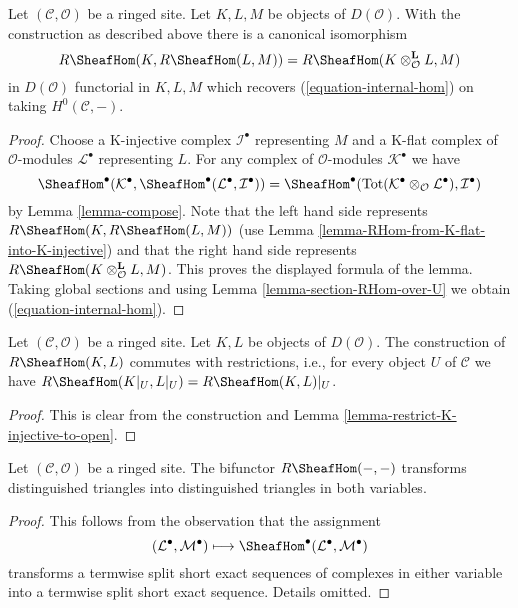 \begin{lemma}
\label{lemma-internal-hom}
Let $(\mathcal{C}, \mathcal{O})$ be a ringed site. Let $K, L, M$ be objects
of $D(\mathcal{O})$. With the construction as described above
there is a canonical isomorphism
$$
R\SheafHom(K, R\SheafHom(L, M)) =
R\SheafHom(K \otimes_\mathcal{O}^\mathbf{L} L, M)
$$
in $D(\mathcal{O})$ functorial in $K, L, M$
which recovers (\ref{equation-internal-hom}) on taking $H^0(\mathcal{C}, -)$.
\end{lemma}

\begin{proof}
Choose a K-injective complex $\mathcal{I}^\bullet$ representing
$M$ and a K-flat complex of $\mathcal{O}$-modules $\mathcal{L}^\bullet$
representing $L$.
For any complex of $\mathcal{O}$-modules $\mathcal{K}^\bullet$
we have
$$
\SheafHom^\bullet(\mathcal{K}^\bullet,
\SheafHom^\bullet(\mathcal{L}^\bullet, \mathcal{I}^\bullet))
=
\SheafHom^\bullet(
\text{Tot}(\mathcal{K}^\bullet \otimes_\mathcal{O} \mathcal{L}^\bullet),
\mathcal{I}^\bullet)
$$
by Lemma \ref{lemma-compose}.
Note that the left hand side represents
$R\SheafHom(K, R\SheafHom(L, M))$ (use
Lemma \ref{lemma-RHom-from-K-flat-into-K-injective})
and that the right hand side represents
$R\SheafHom(K \otimes_\mathcal{O}^\mathbf{L} L, M)$.
This proves the displayed formula of the lemma.
Taking global sections and using Lemma \ref{lemma-section-RHom-over-U}
we obtain (\ref{equation-internal-hom}).
\end{proof}

\begin{lemma}
\label{lemma-restriction-RHom-to-U}
Let $(\mathcal{C}, \mathcal{O})$ be a ringed site. Let $K, L$ be objects
of $D(\mathcal{O})$. The construction of $R\SheafHom(K, L)$
commutes with restrictions, i.e.,
for every object $U$ of $\mathcal{C}$ we have
$R\SheafHom(K|_U, L|_U) = R\SheafHom(K, L)|_U$.
\end{lemma}

\begin{proof}
This is clear from the construction and
Lemma \ref{lemma-restrict-K-injective-to-open}.
\end{proof}

\begin{lemma}
\label{lemma-RHom-triangulated}
Let $(\mathcal{C}, \mathcal{O})$ be a ringed site. The bifunctor
$R\SheafHom(- , -)$ transforms distinguished triangles into
distinguished triangles in both variables.
\end{lemma}

\begin{proof}
This follows from the observation that the assignment
$$
(\mathcal{L}^\bullet, \mathcal{M}^\bullet) \longmapsto
\SheafHom^\bullet(\mathcal{L}^\bullet, \mathcal{M}^\bullet)
$$
transforms a termwise split short exact sequences of complexes in either
variable into a termwise split short exact sequence. Details omitted.
\end{proof}

